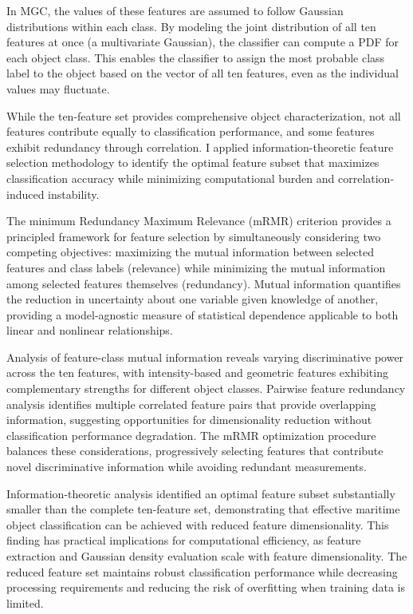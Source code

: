 In \ac{MGC}, the values of these features are assumed to follow Gaussian distributions within each class.
By modeling the joint distribution of all ten features at once (a multivariate Gaussian), the classifier can compute a \acl{PDF} for each object class.
This enables the classifier to assign the most probable class label to the object based on the vector of all ten features, even as the individual values may fluctuate.


While the ten-feature set provides comprehensive object characterization, not all features contribute equally to classification performance, and some features exhibit redundancy through correlation.
I applied information-theoretic feature selection methodology to identify the optimal feature subset that maximizes classification accuracy while minimizing computational burden and correlation-induced instability.

The minimum Redundancy Maximum Relevance (mRMR) criterion provides a principled framework for feature selection by simultaneously considering two competing objectives: maximizing the mutual information between selected features and class labels (relevance) while minimizing the mutual information among selected features themselves (redundancy).
Mutual information quantifies the reduction in uncertainty about one variable given knowledge of another, providing a model-agnostic measure of statistical dependence applicable to both linear and nonlinear relationships.

Analysis of feature-class mutual information reveals varying discriminative power across the ten features, with intensity-based and geometric features exhibiting complementary strengths for different object classes.
Pairwise feature redundancy analysis identifies multiple correlated feature pairs that provide overlapping information, suggesting opportunities for dimensionality reduction without classification performance degradation.
The mRMR optimization procedure balances these considerations, progressively selecting features that contribute novel discriminative information while avoiding redundant measurements.

Information-theoretic analysis identified an optimal feature subset substantially smaller than the complete ten-feature set, demonstrating that effective maritime object classification can be achieved with reduced feature dimensionality.
This finding has practical implications for computational efficiency, as feature extraction and Gaussian density evaluation scale with feature dimensionality.
The reduced feature set maintains robust classification performance while decreasing processing requirements and reducing the risk of overfitting when training data is limited.

